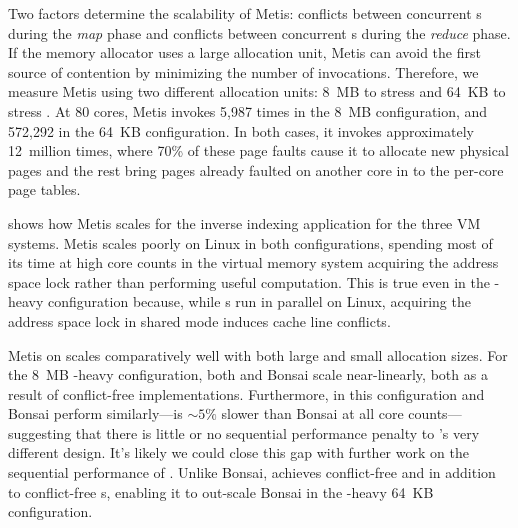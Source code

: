 Two factors determine the scalability of Metis: conflicts between
concurrent s during the \emph{map} phase and conflicts
between concurrent s during the \emph{reduce} phase.
%
If the memory allocator uses a large allocation unit, Metis
can avoid the first source of contention by minimizing the number of
 invocations.
%
Therefore, we measure Metis using two different allocation units: 8~MB
to stress  and 64~KB to stress .
%
At 80 cores, Metis invokes  5,987 times in the 8~MB
configuration, and 572,292 in the 64~KB configuration.
%
In both cases, it invokes  approximately 12~million
times, where 70\% of these page faults cause it to allocate new
physical pages and the rest bring pages already faulted on another
core in to the per-core page tables.

\begin{figure}
  \centering
  
  \label{fig:metis}
\end{figure}


 shows how Metis scales for the inverse indexing
application for the three VM systems.
%
Metis scales poorly on Linux in both configurations, spending most of
its time at high core counts in the virtual memory system acquiring
the address space lock rather than performing useful computation.
%
This is true even in the -heavy configuration because,
while s run in parallel on Linux, acquiring the
address space lock in shared mode induces cache line conflicts.

Metis on \sys scales comparatively well with both large and small
allocation sizes.
%
For the 8~MB -heavy configuration, both \sys and
Bonsai scale near-linearly, both as a result of conflict-free
 implementations.
%
Furthermore, in this configuration \sys and Bonsai perform
similarly---\sys is $\sim5\%$ slower than Bonsai at all core
counts---suggesting that there is little or no sequential performance
penalty to \vm's very different design.  It's likely we could close
this gap with further work on the sequential performance of \sys.
%
Unlike Bonsai, \sys achieves conflict-free  and
 in addition to conflict-free s, enabling
it to out-scale Bonsai in the -heavy 64~KB configuration.


